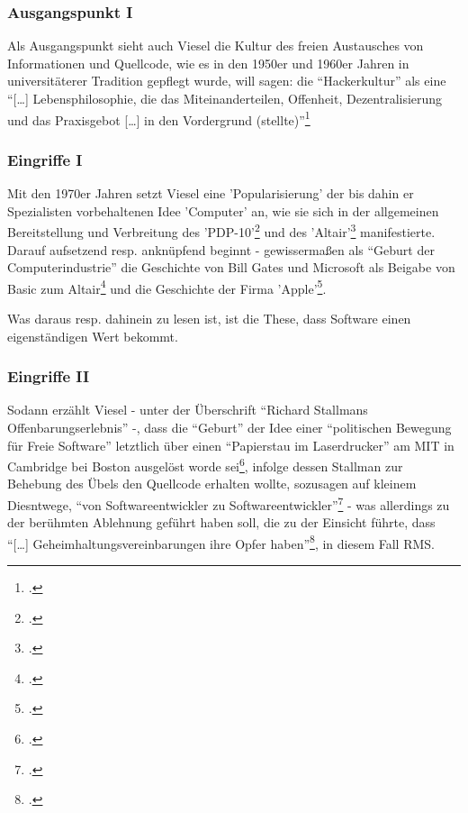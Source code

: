 \documentclass[DIV=calc,BCOR=5mm,11pt,headings=small,oneside,abstract=true, toc=bib]{scrartcl}
\begin{document}
\subsubsection{Ausgangspunkt I}
Als Ausgangspunkt sieht auch Viesel die Kultur des freien Austausches von
Informationen und Quellcode, wie es in den 1950er und 1960er Jahren in
universitäterer Tradition gepflegt wurde, will sagen: die
\enquote{Hackerkultur} als eine \enquote{[\ldots] Lebensphilosophie, die das
Miteinanderteilen,  Offenheit, Dezentralisierung und das Praxisgebot [\ldots] in
den Vordergrund (stellte)}\footcite[vgl.][11f]{Viesel2006a}

\subsubsection{Eingriffe I}

Mit den 1970er Jahren setzt Viesel eine 'Popularisierung' der bis dahin er
Spezialisten vorbehaltenen Idee 'Computer' an, wie sie sich in der allgemeinen
Bereitstellung und Verbreitung des
'PDP-10'\footcite[vgl.][14]{Viesel2006a} und des
'Altair'\footcite[vgl.][16]{Viesel2006a} manifestierte. Darauf aufsetzend resp.
anknüpfend beginnt - gewissermaßen als \enquote{Geburt der
Computerindustrie} die Geschichte von Bill Gates und Microsoft als Beigabe
von Basic zum Altair\footcite[vgl.][17f]{Viesel2006a} und die Geschichte der
Firma 'Apple'\footcite[vgl.][19]{Viesel2006a}. 

Was daraus resp. dahinein zu lesen ist, ist die These, dass Software einen
eigenständigen Wert bekommt.

\subsubsection{Eingriffe II}

Sodann erzählt Viesel - unter der Überschrift \enquote{Richard Stallmans
Offenbarungserlebnis} -, dass die \enquote{Geburt} der Idee einer
\enquote{politischen Bewegung für Freie Software} letztlich über einen
\enquote{Papierstau im Laserdrucker} am MIT in Cambridge bei Boston
ausgelöst worde sei\footcite[vgl.][20ff]{Viesel2006a}, infolge dessen Stallman
zur Behebung des Übels den Quellcode erhalten wollte, sozusagen auf kleinem
Diesntwege, \enquote{von Softwareentwickler zu
Softwareentwickler}\footcite[vgl.][21f]{Viesel2006a} - was allerdings zu
der berühmten Ablehnung geführt haben soll, die zu der Einsicht führte, dass
\enquote{[\ldots] Geheimhaltungsvereinbarungen ihre Opfer
haben}\footcite[vgl.][22]{Viesel2006a}, in diesem Fall RMS.
\end{document}

